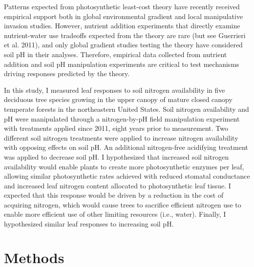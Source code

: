 Patterns expected from photosynthetic least-cost theory have recently received empirical support both in global environmental gradient  and local manipulative invasion  studies. However, nutrient addition experiments that directly examine nutrient-water use tradeoffs expected from the theory are rare (but see Guerrieri et al. 2011), and only global gradient studies testing the theory have considered soil pH in their analyses. Therefore, empirical data collected from nutrient addition and soil pH manipulation experiments are critical to test mechanisms driving responses predicted by the theory.

In this study, I measured leaf responses to soil nitrogen availability in five deciduous tree species growing in the upper canopy of mature closed canopy temperate forests in the northeastern United States. Soil nitrogen availability and pH were manipulated through a nitrogen-by-pH field manipulation experiment with treatments applied since 2011, eight years prior to measurement. Two different soil nitrogen treatments were applied to increase nitrogen availability with opposing effects on soil pH. An additional nitrogen-free acidifying treatment was applied to decrease soil pH. I hypothesized that increased soil nitrogen availability would enable plants to create more photosynthetic enzymes per leaf, allowing similar photosynthetic rates achieved with reduced stomatal conductance and increased leaf nitrogen content allocated to photosynthetic leaf tissue. I expected that this response would be driven by a reduction in the cost of acquiring nitrogen, which would cause trees to sacrifice efficient nitrogen use to enable more efficient use of other limiting resources (i.e., water). Finally, I hypothesized similar leaf responses to increasing soil pH.

\section{Methods}

